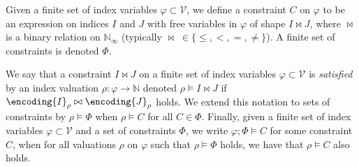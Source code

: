 \begin{defi}
Given a finite set of index variables $\varphi \subset \mathcal{V}$, we define a constraint $C$ on $\varphi$ to be an expression on indices $I$ and $J$ with free variables in $\varphi$ of shape $I \bowtie J$, where $\bowtie$ is a binary relation on $\mathbb{N}_\infty$ (typically $\bowtie\;\in\{\leq,<,=,\neq\}$). A finite set of constraints is denoted $\Phi$.
\label{def:indexc}
\end{defi}
We say that a constraint $I \bowtie J$ on a finite set of index variables $\varphi \subset \mathcal{V}$ is \textit{satisfied} by an index valuation $\rho : \varphi \rightarrow \mathbb{N}$ denoted $\rho \vDash I \bowtie J$ if $\encoding{I}_\rho \bowtie \encoding{J}_\rho$ holds. We extend this notation to sets of constraints by $\rho \vDash \Phi$ when $\rho \vDash C$ for all $C \in \Phi$. Finally, given a finite set of index variables $\varphi \subset \mathcal{V}$ and a set of constraints $\Phi$, we write $\varphi;\Phi\vDash C$ for some constraint $C$, when for all valuations $\rho$ on $\varphi$ such that $\rho \vDash \Phi$ holds, we have that $\rho \vDash C$ also holds.
%
